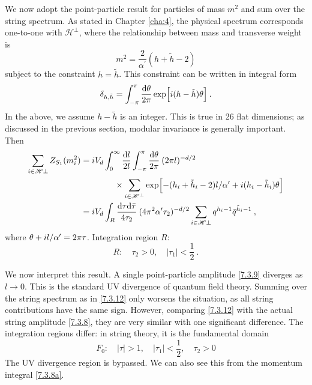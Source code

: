 We now adopt the point-particle result for particles of mass $m^{2}$ and sum over the string spectrum. As stated in Chapter \ref{cha:4}, the physical spectrum corresponds one-to-one with $\mathscr{H}^{\perp}$, where the relationship between mass and transverse weight is 
\begin{equation}
	m^{2}=\frac{2}{\alpha^{\prime}}(h+\tilde{h}-2) \label{7.3.10} 
\end{equation}
subject to the constraint $h=\tilde{h}$. 
This constraint can be written in integral form 
\begin{equation}
	\delta_{h, \tilde{h}}=\int_{-\pi}^{\pi} \frac{\mathrm{d} \theta}{2 \pi} \exp \Bigl[i(h-\tilde{h}) \theta\Bigr] \:. \label{7.3.11} 
\end{equation}
In the above, we assume $h-\tilde{h}$ is an integer. This is true in 26 flat dimensions; as discussed in the previous section, modular invariance is generally important. 
Then 
\begin{align}
	\sum_{i \in \mathscr{H} \perp} Z_{S_{1}}(m_{i}^{2}) &= i V_{d} \int_{0}^{\infty} \frac{\mathrm{d} l}{2 l} 
	\int_{-\pi}^{\pi} \frac{\mathrm{d} \theta}{2 \pi} \: (2 \pi l)^{-d / 2} \nonumber \\
	&\qquad \qquad  \times \sum_{i \in \mathscr{H}^{\perp}} \exp \Bigl[-(h_{i}+\tilde{h}_{i}-2) l / \alpha^{\prime}
	+i(h_{i}-\tilde{h}_{i}) \theta\Bigr]  \nonumber \\
	&=i V_{d} \int_{R} \frac{\mathrm{d} \tau \mathrm{d} \bar{\tau}}{4 \tau_{2}}\: (4 \pi^{2} \alpha^{\prime} \tau_{2})^{-d / 2} 
	\sum_{i \in \mathscr{H} \perp} q^{h_{i}-1} \bar{q}^{\tilde{h}_{i}-1} \:, \label{7.3.12} 
\end{align}
where $\theta+i l / \alpha^{\prime}=2 \pi \tau$. 
Integration region $R$: 
\begin{equation}
	R: \quad \tau_{2}>0, \quad |\tau_{1}|<\frac{1}{2} \:. \label{7.3.13} 
\end{equation}

We now interpret this result. A single point-particle amplitude \eqref{7.3.9} diverges as $l \rightarrow 0$. This is the standard UV divergence of quantum field theory. Summing over the string spectrum as in \eqref{7.3.12} only worsens the situation, as all string contributions have the same sign. However, comparing \eqref{7.3.12} with the actual string amplitude \eqref{7.3.8}, they are very similar with one significant difference. 
The integration regions differ: in string theory, it is the fundamental domain 
\begin{equation}
	F_{0}: \quad|\tau|>1, \quad |\tau_{1}|<\frac{1}{2}, \quad \tau_{2}>0 \label{7.3.14} 
\end{equation}
The UV divergence region is bypassed. We can also see this from the momentum integral \eqref{7.3.8a}. 

